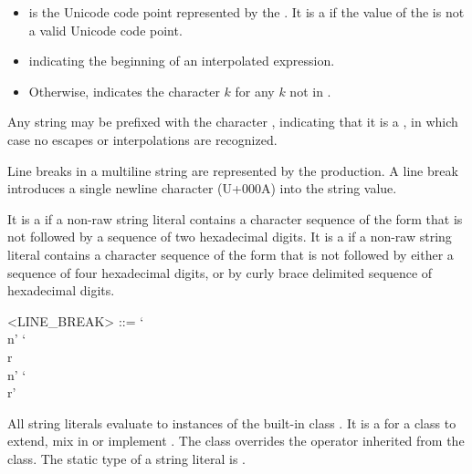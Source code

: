 \documentclass[makeidx]{article}
\begin{document}
{\begin{itemize}
  \noindent
  .
\item
   is
  the Unicode code point represented by the
  .
  It is a  if the value of the
  is not a valid Unicode code point.
  {\color{normativeColor}}
\item
  \lit{\$} indicating the beginning of an interpolated expression.
\item
  { %
    \def\k{$k$}
    Otherwise, \syntax{`\\\k'} indicates the character \k{} for
    any \k{} not in .
  }
\end{itemize}

\LMHash{}%
Any string may be prefixed with the character ,
indicating that it is a ,
in which case no escapes or interpolations are recognized.

\LMHash{}%
Line breaks in a multiline string are represented by
the  production.
A line break introduces a single newline character (U+000A)
into the string value.

\LMHash{}%
It is a  if a non-raw string literal contains
a character sequence of the form  that is not followed by
a sequence of two hexadecimal digits.
It is a  if a non-raw string literal contains
a character sequence of the form  that is not followed by
either a sequence of four hexadecimal digits,
or by curly brace delimited sequence of hexadecimal digits.

\begin{grammar}
<LINE\_BREAK> ::= `\\n'
  \alt `\\r\\n'
  \alt `\\r'
\end{grammar}

\LMHash{}%
All string literals evaluate to instances of the built-in class .
It is a  for a class to
extend, mix in or implement .
The  class overrides the \lit{==} operator inherited from
the  class.
The static type of a string literal is .


}
\end{document}
